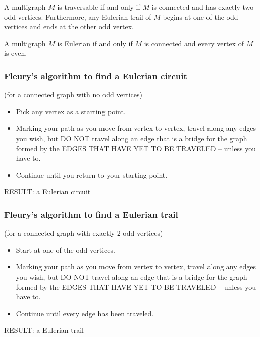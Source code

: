 \documentclass[aspectratio=169]{beamer}
\begin{document}
\begin{frame}
\begin{theorem}
	A multigraph $M$ is traversable if and only if $M$ is connected and has exactly two odd vertices. Furthermore, any Eulerian trail of $M$ begins at one of the odd vertices and ends at the other odd vertex.
\end{theorem}
\begin{theorem}
	A multigraph $M$ is Eulerian if and only if $M$ is connected and every vertex of $M$ is even.
\end{theorem}
\end{frame}




\begin{frame}\frametitle{Fleury's algorithm to find a Eulerian circuit}
(for a connected graph with no odd vertices)

\begin{itemize}
	\item Pick any vertex as a starting point.
	\item Marking your path as you move from vertex to vertex, travel along any edges you wish, but DO NOT travel along an edge that is a bridge for the graph formed by the EDGES THAT HAVE YET TO BE TRAVELED -- unless you have to.
	\item Continue until you return to your starting point.
\end{itemize}
RESULT: a Eulerian circuit
\end{frame}


\begin{frame}\frametitle{Fleury's algorithm to find a Eulerian trail}
(for a connected graph with exactly 2 odd vertices)

\begin{itemize}
	\item Start at one of the odd vertices.
	\item Marking your path as you move from vertex to vertex, travel along any edges you wish, but DO NOT travel along an edge that is a bridge for the graph formed by the EDGES THAT HAVE YET TO BE TRAVELED -- unless you have to.
	\item Continue until every edge has been traveled.
\end{itemize}
RESULT: a Eulerian trail
\end{frame}
\end{document}
